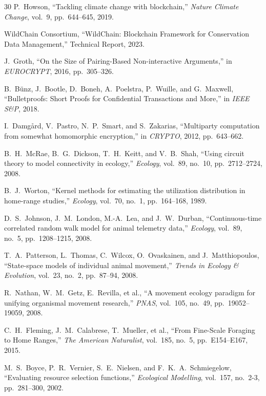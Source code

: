 \documentclass[11pt,letterpaper]{article}
\begin{document}
\begin{thebibliography}{30}
P.~Howson, ``Tackling climate change with blockchain,'' \emph{Nature Climate Change}, vol.~9, pp.~644--645, 2019.

WildChain Consortium, ``WildChain: Blockchain Framework for Conservation Data Management,'' Technical Report, 2023.

J.~Groth, ``On the Size of Pairing-Based Non-interactive Arguments,'' in \emph{EUROCRYPT}, 2016, pp.~305--326.

B.~B{\"u}nz, J.~Bootle, D.~Boneh, A.~Poelstra, P.~Wuille, and G.~Maxwell, ``Bulletproofs: Short Proofs for Confidential Transactions and More,'' in \emph{IEEE S\&P}, 2018.

I.~Damg{\aa}rd, V.~Pastro, N.~P.~Smart, and S.~Zakarias, ``Multiparty computation from somewhat homomorphic encryption,'' in \emph{CRYPTO}, 2012, pp.~643--662.

B.~H.~McRae, B.~G.~Dickson, T.~H.~Keitt, and V.~B.~Shah, ``Using circuit theory to model connectivity in ecology,'' \emph{Ecology}, vol.~89, no.~10, pp.~2712--2724, 2008.

B.~J.~Worton, ``Kernel methods for estimating the utilization distribution in home-range studies,'' \emph{Ecology}, vol.~70, no.~1, pp.~164--168, 1989.

D.~S.~Johnson, J.~M.~London, M.-A.~Lea, and J.~W.~Durban, ``Continuous-time correlated random walk model for animal telemetry data,'' \emph{Ecology}, vol.~89, no.~5, pp.~1208--1215, 2008.

T.~A.~Patterson, L.~Thomas, C.~Wilcox, O.~Ovaskainen, and J.~Matthiopoulos, ``State-space models of individual animal movement,'' \emph{Trends in Ecology \& Evolution}, vol.~23, no.~2, pp.~87--94, 2008.

R.~Nathan, W.~M.~Getz, E.~Revilla, et al., ``A movement ecology paradigm for unifying organismal movement research,'' \emph{PNAS}, vol.~105, no.~49, pp.~19052--19059, 2008.

C.~H.~Fleming, J.~M.~Calabrese, T.~Mueller, et al., ``From Fine-Scale Foraging to Home Ranges,'' \emph{The American Naturalist}, vol.~185, no.~5, pp.~E154--E167, 2015.

M.~S.~Boyce, P.~R.~Vernier, S.~E.~Nielsen, and F.~K.~A.~Schmiegelow, ``Evaluating resource selection functions,'' \emph{Ecological Modelling}, vol.~157, no.~2-3, pp.~281--300, 2002.


\end{thebibliography}
\end{document}
